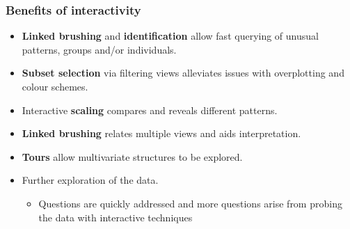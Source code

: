 \documentclass{beamer}
\begin{document}
	\begin{frame}
	\frametitle{Benefits of interactivity}
	\begin{itemize}
		\item \textbf{Linked brushing} and \textbf{identification} allow fast querying of unusual patterns, groups and/or individuals.
		\item \textbf{Subset selection} via filtering views alleviates issues with overplotting and colour schemes.
		\item Interactive \textbf{scaling} compares and reveals different patterns.
		\item \textbf{Linked brushing} relates multiple views and aids interpretation.
		\item \textbf{Tours} allow multivariate structures to be explored.
		\item Further exploration of the data.
		\begin{itemize}
			\item Questions are quickly addressed and more questions arise from probing the data with interactive techniques
		\end{itemize}
	\end{itemize}
	\end{frame}


\end{document}
